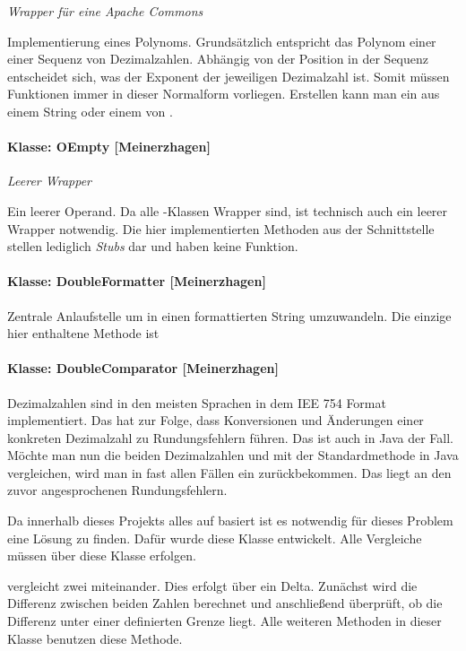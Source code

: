 \textit{Wrapper für eine Apache Commons }

Implementierung eines Polynoms. Grundsätzlich entspricht das Polynom einer einer Sequenz von Dezimalzahlen. Abhängig von der Position in der Sequenz entscheidet sich, was der Exponent der jeweiligen Dezimalzahl ist. Somit müssen Funktionen immer in dieser Normalform vorliegen. Erstellen kann man ein  aus einem String oder einem  von .

\paragraph{Klasse: OEmpty [Meinerzhagen]}

\textit{Leerer Wrapper}

Ein leerer Operand. Da alle -Klassen Wrapper sind, ist technisch auch ein leerer Wrapper notwendig. Die hier implementierten Methoden aus der Schnittstelle stellen lediglich \textit{Stubs} dar und haben keine Funktion.

\paragraph{Klasse: DoubleFormatter [Meinerzhagen]}

Zentrale Anlaufstelle um  in einen formattierten String umzuwandeln. Die einzige hier enthaltene Methode ist 


\paragraph{Klasse: DoubleComparator [Meinerzhagen]}

Dezimalzahlen sind in den meisten Sprachen in dem IEE 754 Format implementiert. Das hat zur Folge, dass Konversionen und Änderungen einer konkreten Dezimalzahl zu Rundungsfehlern führen. Das ist auch in Java der Fall. Möchte man nun die beiden Dezimalzahlen  und  mit der Standardmethode in Java vergleichen, wird man in fast allen Fällen ein  zurückbekommen. Das liegt an den zuvor angesprochenen Rundungsfehlern. 

Da innerhalb dieses Projekts alles auf  basiert ist es notwendig für dieses Problem eine Lösung zu finden. Dafür wurde diese Klasse entwickelt. Alle Vergleiche müssen über diese Klasse erfolgen.

 vergleicht zwei  miteinander. Dies erfolgt über ein Delta. Zunächst wird die Differenz zwischen beiden Zahlen berechnet und anschließend überprüft, ob die Differenz unter einer definierten Grenze liegt. Alle weiteren Methoden in dieser Klasse benutzen diese Methode.

